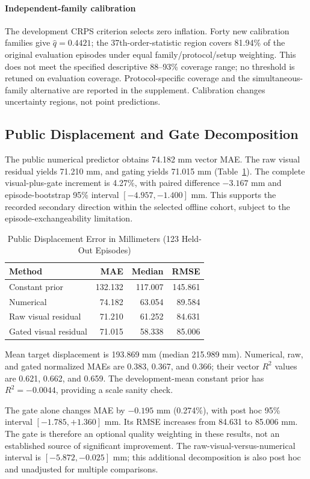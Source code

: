 \documentclass{ieeeaccess}
\begin{document}
\paragraph{Independent-family calibration} 
The development CRPS criterion selects zero inflation. Forty new calibration families give $\hat q=0.4421$; the 37th-order-statistic region covers 81.94\% of the original evaluation episodes under equal family/protocol/setup weighting. This does not meet the specified descriptive 88--93\% coverage range; no threshold is retuned on evaluation coverage. Protocol-specific coverage and the simultaneous-family alternative are reported in the supplement. Calibration changes uncertainty regions, not point predictions.

\subsection{Public Displacement and Gate Decomposition}
The public numerical predictor obtains 74.182 mm vector MAE. The raw visual residual yields 71.210 mm, and gating yields 71.015 mm (Table~\ref{tab:public}). The complete visual-plus-gate increment is 4.27\%, with paired difference $-3.167$ mm and episode-bootstrap 95\% interval $[-4.957,-1.400]$ mm. This supports the recorded secondary direction within the selected offline cohort, subject to the episode-exchangeability limitation.

\begin{table}[t]\caption{Public Displacement Error in Millimeters (123 Held-Out Episodes)}\label{tab:public}\centering
\begin{tabular}{lrrr}\toprule Method & MAE & Median & RMSE\\\midrule
Constant prior & 132.132 & 117.007 & 145.861\\
Numerical & 74.182 & 63.054 & 89.584\\
Raw visual residual & 71.210 & 61.252 & 84.631\\
Gated visual residual & 71.015 & 58.338 & 85.006\\\bottomrule
\end{tabular}\end{table}

Mean target displacement is 193.869 mm (median 215.989 mm). Numerical, raw, and gated normalized MAEs are 0.383, 0.367, and 0.366; their vector $R^2$ values are 0.621, 0.662, and 0.659. The development-mean constant prior has $R^2=-0.0044$, providing a scale sanity check.

The gate alone changes MAE by $-0.195$ mm (0.274\%), with post hoc 95\% interval $[-1.785,+1.360]$ mm. Its RMSE increases from 84.631 to 85.006 mm. The gate is therefore an optional quality weighting in these results, not an established source of significant improvement. The raw-visual-versus-numerical interval is $[-5.872,-0.025]$ mm; this additional decomposition is also post hoc and unadjusted for multiple comparisons.
\end{document}
